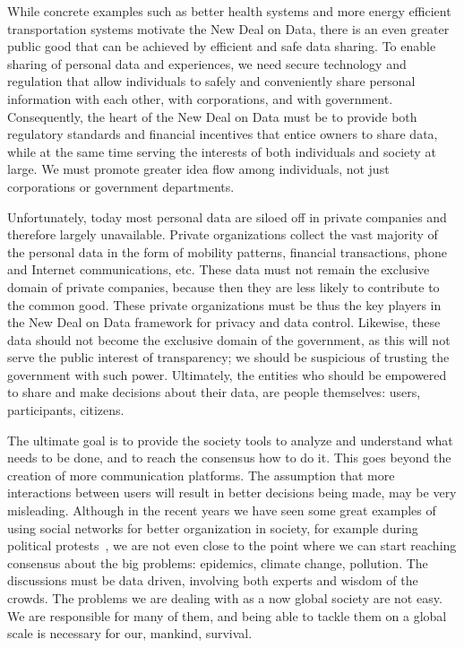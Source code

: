 While concrete examples such as better health systems and more energy efficient transportation systems motivate the New Deal on Data, there is an even greater public good that can be achieved by efficient and safe data sharing.
To enable sharing of personal data and experiences, we need secure technology and regulation that allow individuals to safely and conveniently share personal information with each other, with corporations, and with government.
Consequently, the heart of the New Deal on Data must be to provide both regulatory standards and financial incentives that entice owners to share data, while at the same time serving the interests of both individuals and society at large.
We must promote greater idea flow among individuals, not just corporations or government departments.

Unfortunately, today most personal data are siloed off in private companies and therefore largely unavailable.
Private organizations collect the vast majority of the personal data in the form of mobility patterns, financial transactions, phone and Internet communications, etc.
These data must not remain the exclusive domain of private companies, because then they are less likely to contribute to the common good.
These private organizations must be thus the key players in the New Deal on Data framework for privacy and data control.
Likewise, these data should not become the exclusive domain of the government, as this will not serve the public interest of transparency; we should be suspicious of trusting the government with such power.
Ultimately, the entities who should be empowered to share and make decisions about their data, are people themselves: users, participants, citizens.

The ultimate goal is to provide the society tools to analyze and understand what needs to be done, and to reach the consensus how to do it.
This goes beyond the creation of more communication platforms.
The assumption that more interactions between users will result in better decisions being made, may be very misleading. 
Although in the recent years we have seen some great examples of using social networks for better organization in society, for example during political protests~\cite{grossman2009iran, barry2009protests}, we are not even close to the point where we can start reaching consensus about the big problems: epidemics, climate change, pollution.
The discussions must be data driven, involving both experts and wisdom of the crowds.
The problems we are dealing with as a now global society are not easy. 
We are responsible for many of them, and being able to tackle them on a global scale is necessary for our, mankind, survival.

